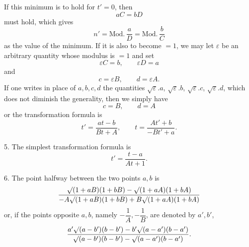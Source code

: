 \noindent If this minimum is to hold for $t'=0$, then
\[
aC=bD
\]
must hold, which gives
\[
n'=\text{Mod.}\,\frac{a}{D}=\text{Mod.}\,\frac{b}{C}
\]
as the value of the minimum. If it is also to become $=1$, we may let $\varepsilon$ be an arbitrary
quantity whose modulus is $=1$ and set
\[
\varepsilon{}C=b,\qquad \varepsilon{}D=a
\]
and
\[
c=\varepsilon{}B,\qquad d=\varepsilon{}A.
\]
If one writes in place of $a,b,c,d$ the quantities $\sqrt{\varepsilon}.a$,
$\sqrt{\varepsilon}.b$, $\sqrt{\varepsilon}.c$, $\sqrt{\varepsilon}.d$,
which does not diminish the generality, then we simply have
\[
c=B,\qquad d=A
\]
or the transformation formula is
\[
t'=\frac{at-b}{Bt+A},\qquad
t=\frac{At'+b}{-Bt'+a}.
\]

5. The simplest transformation formula is
\[
t'=\frac{t-a}{At+1}.
\]

6. The point halfway between the two points $a,b$ is
\[
\frac{\mathord{\surd}(1+aB)(1+bB)-\mathord{\surd}(1+aA)(1+bA)}
{-A\mathord{\surd}(1+aB)(1+bB)+B\mathord{\surd}(1+aA)(1+bA)}
\]
or, if the points opposite $a,b$, namely $-\dfrac{1}{A},-\dfrac{1}{B}$,
are denoted by $a',b'$,
\[
\frac{a'\mathord{\surd}(a-b')(b-b')-b'\mathord{\surd}(a-a')(b-a')}
{\mathord{\surd}(a-b')(b-b')-\mathord{\surd}(a-a')(b-a')}.
\]
